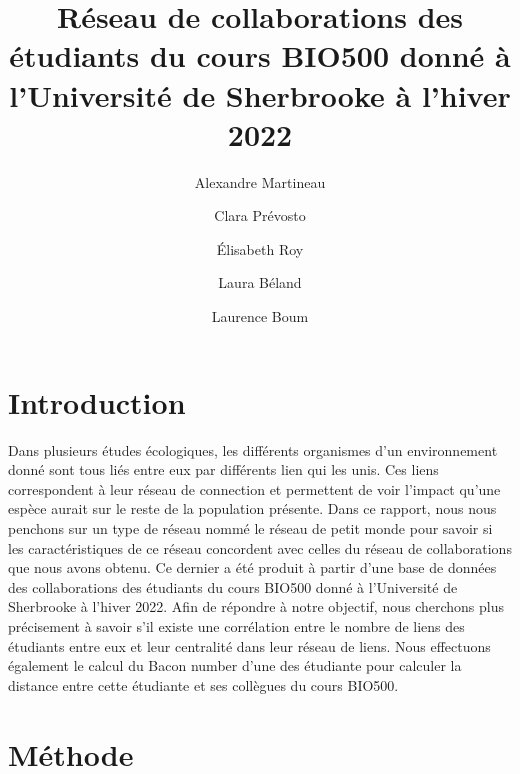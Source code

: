 \documentclass[9pt,twocolumn,twoside,]{pnas-new}
\title{Réseau de collaborations des étudiants du cours BIO500 donné à
l'Université de Sherbrooke à l'hiver 2022}
\author[a]{Alexandre Martineau}
\author[a]{Clara Prévosto}
\author[a]{Élisabeth Roy}
\author[a]{Laura Béland}
\author[a]{Laurence Boum}
\affil[a]{Université de Sherbrooke, Départment de biologie, 2500
Boulevard de l'Université, Sherbrooke, Québec, J1K 2R1}
\begin{document}
\verticaladjustment{-2pt}



\maketitle
\thispagestyle{firststyle}


\acknow{}

\hypertarget{introduction}{%
\section{Introduction}\label{introduction}}

Dans plusieurs études écologiques, les différents organismes d'un
environnement donné sont tous liés entre eux par différents lien qui les
unis. Ces liens correspondent à leur réseau de connection et permettent
de voir l'impact qu'une espèce aurait sur le reste de la population
présente. Dans ce rapport, nous nous penchons sur un type de réseau
nommé le réseau de petit monde pour savoir si les caractéristiques de ce
réseau concordent avec celles du réseau de collaborations que nous avons
obtenu. Ce dernier a été produit à partir d'une base de données des
collaborations des étudiants du cours BIO500 donné à l'Université de
Sherbrooke à l'hiver 2022. Afin de répondre à notre objectif, nous
cherchons plus précisement à savoir s'il existe une corrélation entre le
nombre de liens des étudiants entre eux et leur centralité dans leur
réseau de liens. Nous effectuons également le calcul du Bacon number
d'une des étudiante pour calculer la distance entre cette étudiante et
ses collègues du cours BIO500.

\hypertarget{muxe9thode}{%
\section{Méthode}\label{muxe9thode}}
\end{document}

